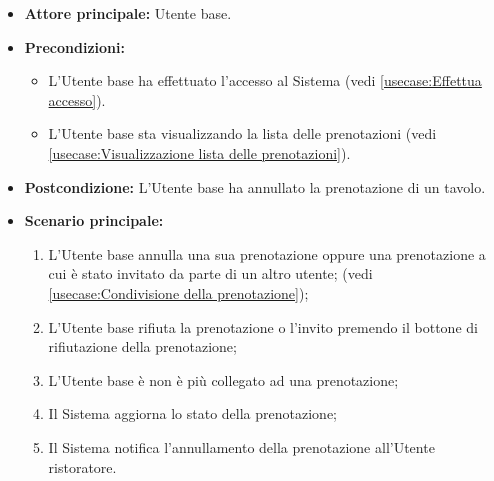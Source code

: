 \label{usecase:Annullamento della prenotazione}
\begin{itemize}
	\item \textbf{Attore principale:} Utente base.

	\item \textbf{Precondizioni:}
	      \begin{itemize}
		      \item L'Utente base ha effettuato l'accesso al Sistema (vedi \autoref{usecase:Effettua accesso}).
		      \item L'Utente base sta visualizzando la lista delle prenotazioni (vedi \autoref{usecase:Visualizzazione lista delle prenotazioni}).
	      \end{itemize}

	\item \textbf{Postcondizione:}
	      L'Utente base ha annullato la prenotazione di un tavolo.

	\item \textbf{Scenario principale:}
	      \begin{enumerate}
			  \item L'Utente base annulla una sua prenotazione oppure una prenotazione a cui è stato invitato 
			  da parte di un altro utente; (vedi \autoref{usecase:Condivisione della prenotazione});

		      \item L'Utente base rifiuta la prenotazione o l'invito premendo il bottone di rifiutazione della prenotazione;

		      \item L'Utente base è non è più collegato ad una prenotazione;

		      \item Il Sistema aggiorna lo stato della prenotazione;

		      \item Il Sistema notifica l'annullamento della prenotazione
		            all'Utente ristoratore.
	      \end{enumerate}
\end{itemize}
